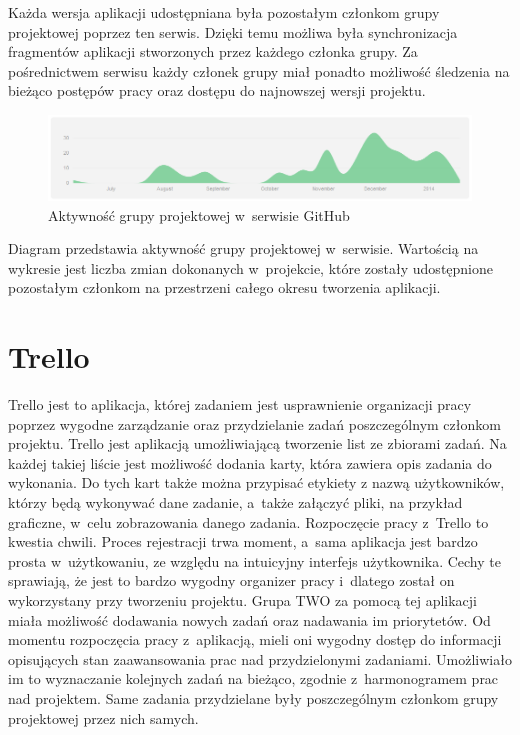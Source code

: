 Każda wersja aplikacji udostępniana była pozostałym członkom grupy projektowej poprzez ten serwis. Dzięki temu możliwa była synchronizacja fragmentów aplikacji stworzonych przez każdego członka grupy. Za pośrednictwem serwisu każdy członek grupy miał ponadto możliwość śledzenia na bieżąco postępów pracy oraz dostępu do najnowszej wersji projektu. 
\begin{figure}[h]
	\centering
	\includegraphics[width=1.00\textwidth]{images/git.png}
	\caption{Aktywność grupy projektowej w~serwisie GitHub}
\end{figure}

Diagram przedstawia aktywność grupy projektowej w~serwisie. Wartością na wykresie jest liczba zmian dokonanych w~projekcie, które zostały udostępnione pozostałym członkom na przestrzeni całego okresu tworzenia aplikacji. 

\section{Trello}
Trello jest to aplikacja, której zadaniem jest usprawnienie organizacji pracy poprzez wygodne zarządzanie oraz przydzielanie zadań poszczególnym członkom projektu. Trello jest aplikacją umożliwiającą tworzenie list ze zbiorami zadań. Na każdej takiej liście jest możliwość dodania karty, która zawiera opis zadania do wykonania. Do tych kart także można przypisać etykiety z nazwą użytkowników, którzy będą wykonywać dane zadanie, a~także załączyć pliki,  na przykład graficzne, w~celu zobrazowania danego zadania. Rozpoczęcie pracy z~Trello  to kwestia chwili. Proces rejestracji trwa moment, a~sama aplikacja jest bardzo prosta w~użytkowaniu, ze względu na intuicyjny interfejs użytkownika. Cechy te sprawiają, że jest to bardzo wygodny organizer pracy i~dlatego został on wykorzystany przy tworzeniu projektu. Grupa TWO za pomocą tej aplikacji miała możliwość dodawania nowych zadań oraz nadawania im priorytetów. Od momentu rozpoczęcia pracy z~aplikacją, mieli oni wygodny dostęp do informacji opisujących stan zaawansowania prac nad przydzielonymi zadaniami. Umożliwiało im to wyznaczanie  kolejnych zadań na bieżąco, zgodnie z~harmonogramem prac nad projektem. Same zadania przydzielane były poszczególnym członkom grupy projektowej przez nich samych. 

